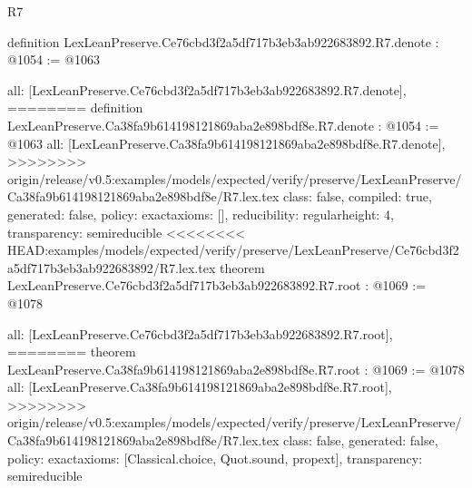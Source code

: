\begin{lexlean}{R7}
\begin{coremodule}
{{{{{{{{{{{definition LexLeanPreserve.Ce76cbd3f2a5df717b3eb3ab922683892.R7.denote : @1054 := @1063 {
  all: [LexLeanPreserve.Ce76cbd3f2a5df717b3eb3ab922683892.R7.denote],
========
definition LexLeanPreserve.Ca38fa9b614198121869aba2e898bdf8e.R7.denote : @1054 := @1063 {
  all: [LexLeanPreserve.Ca38fa9b614198121869aba2e898bdf8e.R7.denote],
>>>>>>>> origin/release/v0.5:examples/models/expected/verify/preserve/LexLeanPreserve/Ca38fa9b614198121869aba2e898bdf8e/R7.lex.tex
  class: false,
  compiled: true,
  generated: false,
  policy: exact{axioms: []},
  reducibility: regular{height: 4},
  transparency: semireducible
}
<<<<<<<< HEAD:examples/models/expected/verify/preserve/LexLeanPreserve/Ce76cbd3f2a5df717b3eb3ab922683892/R7.lex.tex
theorem LexLeanPreserve.Ce76cbd3f2a5df717b3eb3ab922683892.R7.root : @1069 := @1078 {
  all: [LexLeanPreserve.Ce76cbd3f2a5df717b3eb3ab922683892.R7.root],
========
theorem LexLeanPreserve.Ca38fa9b614198121869aba2e898bdf8e.R7.root : @1069 := @1078 {
  all: [LexLeanPreserve.Ca38fa9b614198121869aba2e898bdf8e.R7.root],
>>>>>>>> origin/release/v0.5:examples/models/expected/verify/preserve/LexLeanPreserve/Ca38fa9b614198121869aba2e898bdf8e/R7.lex.tex
  class: false,
  generated: false,
  policy: exact{axioms: [Classical.choice, Quot.sound, propext]},
  transparency: semireducible
}

}}}}}}}}}}}}}
\end{coremodule}
\end{lexlean}
